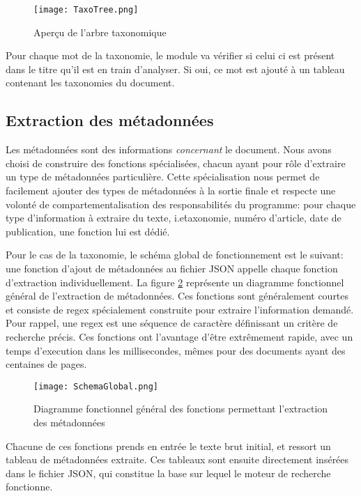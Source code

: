 \begin{figure}[h!]
  \centering
  \texttt{[image: TaxoTree.png]}
	\caption[]{Aperçu de l'arbre taxonomique}
  \label{fig:tree}
\end{figure}

Pour chaque mot de la taxonomie, le module va vérifier si celui ci est présent dans le titre qu'il est en train d'analyser.
Si oui, ce mot est ajouté à un tableau contenant les taxonomies du document.

\subsection{Extraction des métadonnées}
Les métadonnées sont des informations \textit{concernant} le document.
Nous avons choisi de construire des fonctions spécialisées, chacun ayant pour rôle d'extraire un type de métadonnées particulière.
Cette spécialisation nous permet de facilement ajouter des types de métadonnées à la sortie finale et respecte une volonté de compartementalisation des responsabilités du programme: pour chaque type d'information à extraire du texte, i.e\. taxonomie, numéro d'article, date de publication, une fonction lui est dédié. 

Pour le cas de la taxonomie, le schéma global de fonctionnement est le suivant: une fonction d'ajout de métadonnées au fichier JSON appelle chaque fonction d'extraction individuellement.
La figure \ref{fig:globalMeta} représente un diagramme fonctionnel général de l'extraction de métadonnées. 
Ces fonctions sont généralement courtes et consiste de regex spécialement construite pour extraire l'information demandé.
Pour rappel, une regex est une séquence de caractère définissant un critère de recherche précis.
Ces fonctions ont l'avantage d'être extrêmement rapide, avec un temps d'execution dans les millisecondes, mêmes pour des documents ayant des centaines de pages. 

\begin{figure}[h!]
  \centering
	\texttt{[image: SchemaGlobal.png]}
	\caption[]{Diagramme fonctionnel général des fonctions permettant l'extraction des métadonnées}
  \label{fig:globalMeta}
\end{figure}

Chacune de ces fonctions prends en entrée le texte brut initial, et ressort un tableau de métadonnées extraite.
Ces tableaux sont ensuite directement insérées dans le fichier JSON, qui constitue la base sur lequel le moteur de recherche fonctionne.

